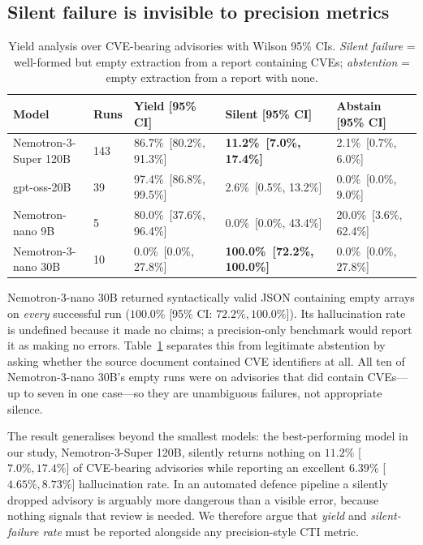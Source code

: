 \documentclass[10pt,twocolumn]{article}
\begin{document}
\subsection{Silent failure is invisible to precision metrics}
\label{sec:silent}

\begin{table}
\centering\footnotesize
\caption{Yield analysis over CVE-bearing advisories with Wilson 95\% CIs. \emph{Silent failure} =
well-formed but empty extraction from a report containing CVEs; \emph{abstention} = empty
extraction from a report with none.}
\label{tab:silent}
\setlength{\tabcolsep}{6pt}
\begin{tabular}{@{}lllll@{}}
\toprule
Model & Runs & Yield [95\% CI] & Silent [95\% CI] & Abstain [95\% CI] \\
\midrule
Nemotron-3-Super 120B & 143 & 86.7\%\ [80.2\%, 91.3\%]  & \bf 11.2\%\ [7.0\%, 17.4\%]    & 2.1\%\ [0.7\%, 6.0\%] \\
gpt-oss-20B           & 39  & 97.4\%\ [86.8\%, 99.5\%]  & 2.6\%\ [0.5\%, 13.2\%]          & 0.0\%\ [0.0\%, 9.0\%] \\
Nemotron-nano 9B      & 5   & 80.0\%\ [37.6\%, 96.4\%]  & 0.0\%\ [0.0\%, 43.4\%]          & 20.0\%\ [3.6\%, 62.4\%] \\
Nemotron-3-nano 30B   & 10  & 0.0\%\ [0.0\%, 27.8\%]    & \bf 100.0\%\ [72.2\%, 100.0\%]  & 0.0\%\ [0.0\%, 27.8\%] \\
\bottomrule
\end{tabular}
\end{table}

Nemotron-3-nano 30B returned syntactically valid JSON containing empty arrays
on \emph{every} successful run ($100.0\%$ [95\% CI: $72.2\%, 100.0\%$]). Its hallucination rate is undefined because it
made no claims; a precision-only benchmark would report it as making no errors.
Table~\ref{tab:silent} separates this from legitimate abstention by asking
whether the source document contained CVE identifiers at all. All ten of Nemotron-3-nano 30B's empty runs were on advisories that did contain CVEs---up to seven
in one case---so they are unambiguous failures, not appropriate silence.

The result generalises beyond the smallest models: the best-performing model in our study, Nemotron-3-Super 120B, silently returns nothing on $11.2\%$ [$7.0\%, 17.4\%$] of CVE-bearing advisories
while reporting an excellent $6.39\%$ [$4.65\%, 8.73\%$] hallucination rate. In an automated
defence pipeline a silently dropped advisory is arguably more dangerous than a
visible error, because nothing signals that review is needed. We therefore
argue that \emph{yield} and \emph{silent-failure rate} must be reported
alongside any precision-style CTI metric.
\end{document}
